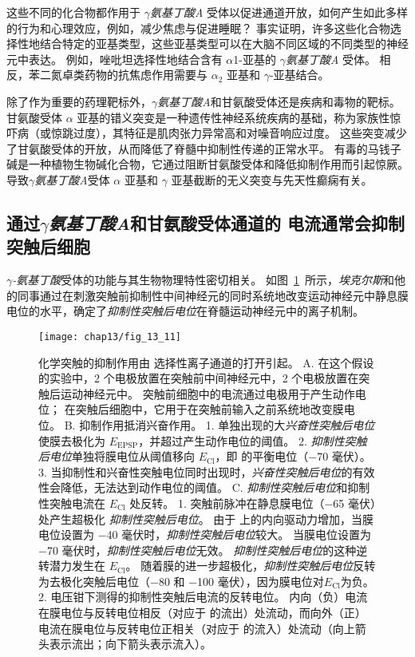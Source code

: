 这些不同的化合物都作用于 \textit{$\gamma$氨基丁酸A} 受体以促进通道开放，如何产生如此多样的行为和心理效应，例如，减少焦虑与促进睡眠？
事实证明，许多这些化合物选择性地结合特定的亚基类型，这些亚基类型可以在大脑不同区域的不同类型的神经元中表达。
例如，唑吡坦选择性地结合含有 $\alpha$1-亚基的 \textit{$\gamma$氨基丁酸A} 受体。
相反，苯二氮卓类药物的抗焦虑作用需要与 $\alpha_2$ 亚基和 $\gamma$-亚基结合。


除了作为重要的药理靶标外，\textit{$\gamma$氨基丁酸A}和甘氨酸受体还是疾病和毒物的靶标。
甘氨酸受体 $\alpha$ 亚基的错义突变是一种遗传性神经系统疾病的基础，称为家族性惊吓病（或惊跳过度），其特征是肌肉张力异常高和对噪音响应过度。
这些突变减少了甘氨酸受体的开放，从而降低了脊髓中抑制性传递的正常水平。
有毒的马钱子碱是一种植物生物碱化合物，它通过阻断甘氨酸受体和降低抑制作用而引起惊厥。
导致\textit{$\gamma$氨基丁酸A}受体 $\alpha$ 亚基和 $\gamma$ 亚基截断的无义突变与先天性癫痫有关。



\subsection{通过\textit{$\gamma$氨基丁酸A}和甘氨酸受体通道的  电流通常会抑制突触后细胞}

\textit{$\gamma$-氨基丁酸}受体的功能与其生物物理特性密切相关。
如图~\ref{fig:13_11}~所示，\textit{埃克尔斯}和他的同事通过在刺激突触前抑制性中间神经元的同时系统地改变运动神经元中静息膜电位的水平，确定了\textit{抑制性突触后电位}在脊髓运动神经元中的离子机制。


\begin{figure}[htbp]
	\centering
	\texttt{[image: chap13/fig\_13\_11]}
	\caption{化学突触的抑制作用由  选择性离子通道的打开引起。
		A. 在这个假设的实验中，2 个电极放置在突触前中间神经元中，2 个电极放置在突触后运动神经元中。
		突触前细胞中的电流通过电极用于产生动作电位；
		在突触后细胞中，它用于在突触前输入之前系统地改变膜电位。
		B. 抑制作用抵消兴奋作用。
		1. 单独出现的大\textit{兴奋性突触后电位}使膜去极化为 $E_{\text{EPSP}}$，并超过产生动作电位的阈值。
		2. \textit{抑制性突触后电位}单独将膜电位从阈值移向 $E_\text{Cl}$，即  的平衡电位（−70 毫伏）。
		3. 当抑制性和兴奋性突触电位同时出现时，\textit{兴奋性突触后电位}的有效性会降低，无法达到动作电位的阈值。
		C. \textit{抑制性突触后电位}和抑制性突触电流在 $E_\text{Cl}$ 处反转。
		1. 突触前脉冲在静息膜电位（−65 毫伏）处产生超极化 \textit{抑制性突触后电位}。
		由于  上的内向驱动力增加，当膜电位设置为 −40 毫伏时，\textit{抑制性突触后电位}较大。
		当膜电位设置为 −70 毫伏时，\textit{抑制性突触后电位}无效。
		\textit{抑制性突触后电位}的这种逆转潜力发生在 $E_\text{Cl}$。
		随着膜的进一步超极化，\textit{抑制性突触后电位}反转为去极化突触后电位（−80 和 −100 毫伏），因为膜电位对$E_\text{Cl}$为负。
		2. 电压钳下测得的抑制性突触后电流的反转电位。
		内向（负）电流在膜电位与反转电位相反（对应于  的流出）处流动，而向外（正）电流在膜电位与反转电位正相关（对应于  的流入）处流动（向上箭头表示流出；向下箭头表示流入）。}
	\label{fig:13_11}
\end{figure}



